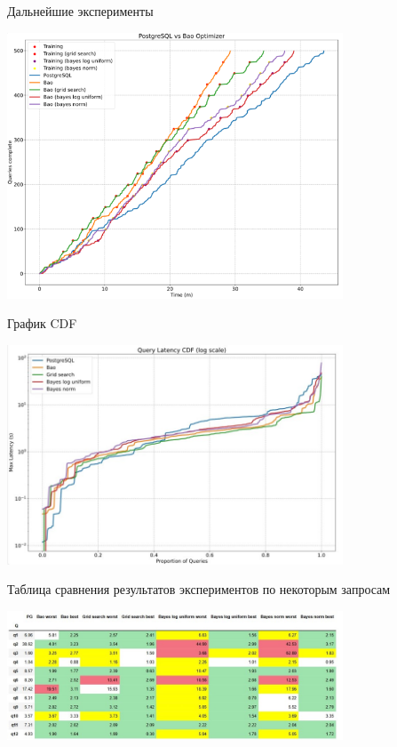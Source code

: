 \documentclass{beamer}
\begin{document}
\begin{frame}{Дальнейшие эксперименты}
\begin{center}
\includegraphics[width=10cm]{diff-algos.png}
\end{center}
\end{frame}
\begin{frame}{График CDF}
\begin{center}
\includegraphics[width=10cm]{cdf.jpg}
\end{center}
\end{frame}
\begin{frame}{Таблица сравнения результатов экспериментов по некоторым запросам}
\begin{center}
\includegraphics[width=10cm]{table.jpg}
\end{center}
\end{frame}
\end{document}
